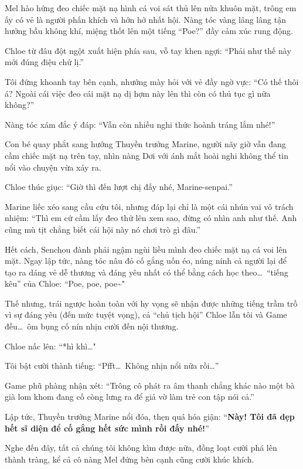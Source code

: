 \documentclass[../main.tex]{subfiles}
\begin{document}
\ct

Mel hào hứng đeo chiếc mặt nạ hình cá voi sát thủ lên nửa khuôn mặt, trông em ấy có vẻ là người phấn khích và hớn hở nhất hội. Nàng tóc vàng lâng lâng tận hưởng bầu không khí, miệng thốt lên một tiếng ``Poe?'' đầy cảm xúc rung động.


Chloe từ đâu đột ngột xuất hiện phía sau, vỗ tay khen ngợi: ``Phải như thế này mới đúng điệu chứ lị.''

Tôi đứng khoanh tay bên cạnh, nhướng mày hỏi với vẻ đầy ngờ vực: ``Có thế thôi á? Ngoài cái việc đeo cái mặt nạ dị hợm này lên thì còn có thủ tục gì nữa không?''

Nàng tóc xám đắc ý đáp: ``Vẫn còn nhiều nghi thức hoành tráng lắm nhé!''

Con bé quay phắt sang hướng Thuyền trưởng Marine, người nãy giờ vẫn đang cầm chiếc mặt nạ trên tay, nhìn nàng Dơi với ánh mắt hoài nghi không thể tin nổi vào chuyện vừa xảy ra.

Chloe thúc giục: ``Giờ thì đến lượt chị đấy nhé, Marine-senpai.''

Marine liếc xéo sang cầu cứu tôi, nhưng đáp lại chỉ là một cái nhún vai vô trách nhiệm: ``Thì em cứ cầm lấy đeo thử lên xem sao, đừng có nhìn anh như thế. Anh cũng mù tịt chẳng biết cái hội này nó chơi trò gì đâu.''

Hết cách, Senchou đành phải ngậm ngùi liều mình đeo chiếc mặt nạ cá voi lên mặt. Ngay lập tức, nàng tóc nâu đỏ cố gắng uốn éo, núng nính cả người lại để tạo ra dáng vẻ dễ thương và đáng yêu nhất có thể bằng cách học theo\dots\ ``tiếng kêu'' của Chloe: ``Poe, poe, poe\~{}"


Thế nhưng, trái ngược hoàn toàn với hy vọng sẽ nhận được những tiếng trầm trồ vì sự đáng yêu (đến mức tuyệt vọng), cả ``chủ tịch hội'' Chloe lẫn tôi và Game đều\dots\ ôm bụng cố nín nhịn cười đến nội thương.

Chloe nấc lên: ``*hì khì\dots"

Tôi bật cười thành tiếng: ``Pfft\dots\ Không nhịn nổi nữa rồi\dots''

Game phũ phàng nhận xét: ``Trông cô phát ra âm thanh chẳng khác nào một bà già lom khom đang cố còng lưng ra để giả vờ làm trẻ con tập nói cả.''

Lập tức, Thuyền trưởng Marine nổi đóa, thẹn quá hóa giận: ``\textbf{Này! Tôi đã dẹp hết sĩ diện để cố gắng hết sức mình rồi đấy nhé!}''

Nghe đến đây, tất cả chúng tôi không kìm được nữa, đồng loạt cười phá lên thành tràng, kể cả cô nàng Mel đứng bên cạnh cũng cười khúc khích.
\end{document}
